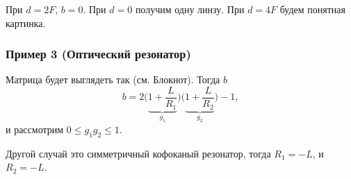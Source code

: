 При $d=2F$, $b=0$. При $d=0$ получим одну линзу. При $d=4F$ будем понятная картинка. 



\subsubsection*{Пример 3 (Оптический резонатор)}

Матрица будет выглядеть так (см. Блокнот). Тогда $b$ 
\begin{equation*}
    b = 2 \bigg(\underbrace{1+\frac{L}{R_1}}_{g_1}\bigg)\bigg(\underbrace{1+\frac{L}{R_2}}_{g_2}\bigg) - 1,
\end{equation*}
и рассмотрим $0 \leq g_1 g_2 \leq 1$.

Другой случай это симметричный кофоканый резонатор, тогда $R_1 = -L$, и $R_2 = - L$. 